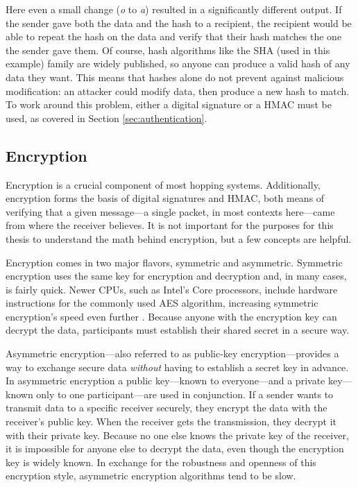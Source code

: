 \par Here even a small change (\textit{o} to \textit{a}) resulted in a significantly different output. If the sender gave both the data and the hash to a recipient, the recipient would be able to repeat the hash on the data and verify that their hash matches the one the sender gave them. Of course, hash algorithms like the \ac{SHA} (used in this example) family are widely published, so anyone can produce a valid hash of any data they want. This means that hashes alone do not prevent against malicious modification: an attacker could modify data, then produce a new hash to match. To work around this problem, either a digital signature or a \ac{HMAC} must be used, as covered in Section \ref{sec:authentication}.

\subsection{Encryption}
\label{sec:encryption}
\par Encryption is a crucial component of most hopping systems. Additionally, encryption forms the basis of digital signatures and \ac{HMAC}, both means of verifying that a given message---a single packet, in most contexts here---came from where the receiver believes. It is not important for the purposes for this thesis to understand the math behind encryption, but a few concepts are helpful.

\par Encryption comes in two major flavors, symmetric and asymmetric. Symmetric encryption uses the same key for encryption and decryption and, in many cases, is fairly quick. Newer \acp{CPU}, such as Intel's Core processors, include hardware instructions for the commonly used \ac{AES} algorithm, increasing symmetric encryption's speed even further \cite{IntelAES}. Because anyone with the encryption key can decrypt the data, participants must establish their shared secret in a secure way.

\par Asymmetric encryption---also referred to as public-key encryption---provides a way to exchange secure data \textit{without} having to establish a secret key in advance. In asymmetric encryption a public key---known to everyone---and a private key---known only to one participant---are used in conjunction. If a sender wants to transmit data to a specific receiver securely, they encrypt the data with the receiver's public key. When the receiver gets the transmission, they decrypt it with their private key. Because no one else knows the private key of the receiver, it is impossible for anyone else to decrypt the data, even though the encryption key is widely known. In exchange for the robustness and openness of this encryption style, asymmetric encryption algorithms tend to be slow.

